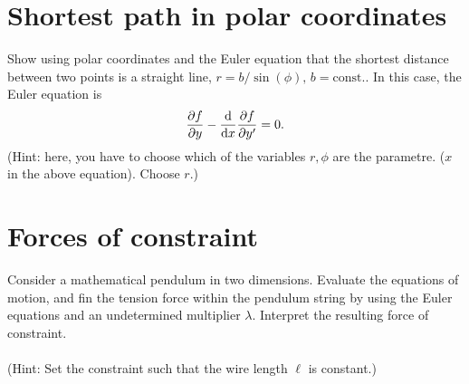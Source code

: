 \documentclass{article}
\begin{document}
    \section{Shortest path in polar coordinates}
        Show using polar coordinates and the Euler equation that the shortest distance between two points is a straight line, $r = b / \sin(\phi), \, b = \mathrm{const.}$. In this case, the Euler equation is
        \begin{equation*}
            \pdv{f}{y} - \dv{x} \pdv{f}{y'} = 0.
        \end{equation*}
        (Hint: here, you have to choose which of the variables $r, \phi$ are the parametre. ($x$ in the above equation). Choose $r$.)

    \section{Forces of constraint}
        Consider a mathematical pendulum in two dimensions. Evaluate the equations of motion, and fin the tension force within the pendulum string by using the Euler equations and an undetermined multiplier $\lambda$. Interpret the resulting force of constraint. \\ \\ 
        (Hint: Set the constraint such that the wire length $\ell$ is constant.)
\end{document}
